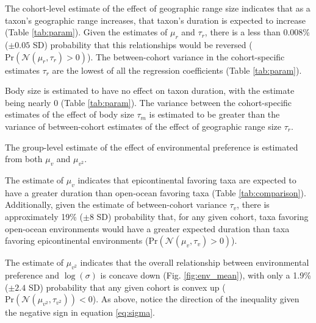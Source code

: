 \documentclass{article}
\begin{document}
The cohort-level estimate of the effect of geographic range size indicates that as a taxon's geographic range increases, that taxon's duration is expected to increase (Table \ref{tab:param}). Given the estimates of \(\mu_{r}\) and \(\tau_{r}\), there is a less than 0.008\% (\(\pm 0.05\) SD) probability that this relationships would be reversed (\(\mathrm{Pr}\left(\mathcal{N}(\mu_{r}, \tau_{r}) > 0\right)\)). The between-cohort variance in the cohort-specific estimates \(\tau_{r}\) are the lowest of all the regression coefficients (Table \ref{tab:param}).

Body size is estimated to have no effect on taxon duration, with the estimate being nearly 0 (Table \ref{tab:param}). The variance between the cohort-specific estimates of the effect of body size \(\tau_{m}\) is estimated to be greater than the variance of between-cohort estimates of the effect of geographic range size \(\tau_{r}\). 

The group-level estimate of the effect of environmental preference is estimated from both \(\mu_{v}\) and \(\mu_{v^{2}}\). 

The estimate of \(\mu_{v}\) indicates that epicontinental favoring taxa are expected to have a greater duration than open-ocean favoring taxa (Table \ref{tab:comparison}). Additionally, given the estimate of between-cohort variance \(\tau_{v}\), there is approximately 19\% (\(\pm 8\) SD) probability that, for any given cohort, taxa favoring open-ocean environments would have a greater expected duration than taxa favoring epicontinental environments (\(\mathrm{Pr}\left(\mathcal{N}(\mu_{v}, \tau_{v}) > 0 \right)\)). 

The estimate of \(\mu_{v^{2}}\) indicates that the overall relationship between environmental preference and \(\log(\sigma)\) is concave down (Fig. \ref{fig:env_mean}), with only a 1.9\% (\(\pm 2.4\) SD) probability that any given cohort is convex up (\(\mathrm{Pr}\left(\mathcal{N}(\mu_{v^{2}}, \tau_{v^{2}})\right) < 0\)). As above, notice the direction of the inequality given the negative sign in equation \ref{eq:sigma}. 
\end{document}
